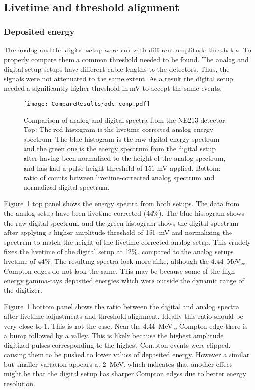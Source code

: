 \documentclass[main.tex]{subfiles}
\begin{document}
\subsection{Livetime and threshold alignment}
\subsubsection{Deposited energy}
The analog and the digital setup were run with different amplitude thresholds. To properly compare them a common threshold needed to be found. The analog and digital setup setups have different cable lengths to the detectors. Thus, the signals were not attenuated to the same extent. As a result the digital setup needed a significantly higher threshold in \si{mV} to accept the same events.

\begin{figure}[h!]
    \centering
        \texttt{[image: CompareResults/qdc\_comp.pdf]}
        \caption[Comparison of analog and digital spectra from the NE213 detector]{Comparison of analog and digital spectra from the NE213 detector. Top: The red histogram is the livetime-corrected analog energy spectrum. The blue histogram is the raw digital energy spectrum and the green one is the energy spectrum from the digital setup after having been normalized to the height of the analog spectrum, and has had a pulse height threshold of 151 mV applied. Bottom: ratio of counts between livetime-corrected analog spectrum and normalized digital spectrum.}
    \label{fig:qdc_comp}
\end{figure}
Figure~\ref{fig:qdc_comp} top panel shows the energy spectra from both setups. The data from the analog setup have been livetime corrected (44\%). The blue histogram shows the raw digital spectrum, and the green histogram shows the digital spectrum after applying a higher amplitude threshold of \SI{151}{mV} and normalizing the spectrum to match the height of the livetime-corrected analog setup. This crudely fixes the livetime of the digital setup at 12\%. compared to the analog setups livetime of 44\%. The resulting spectra look more alike, although the \SI{4.44}{\MeV}$_\text{ee}$ Compton edges do not look the same. This may be because some of the high energy gamma-rays deposited energies which were outside the dynamic range of the digitizer.


Figure~\ref{fig:qdc_comp} bottom panel shows the ratio between the digital and analog spectra after livetime adjustments and threshold alignment. Ideally this ratio should be very close to 1. This is not the case. Near the \SI{4.44}{\MeV}$_\text{ee}$ Compton edge there is a bump followed by a valley. This is likely because the highest amplitude digitized pulses corresponding to the highest Compton events were clipped, causing them to be pushed to lower values of deposited energy. However a similar but smaller variation appears at \SI{2}{MeV}, which indicates that another effect might be that the digital setup has sharper Compton edges due to better energy resolution.
\end{document}
